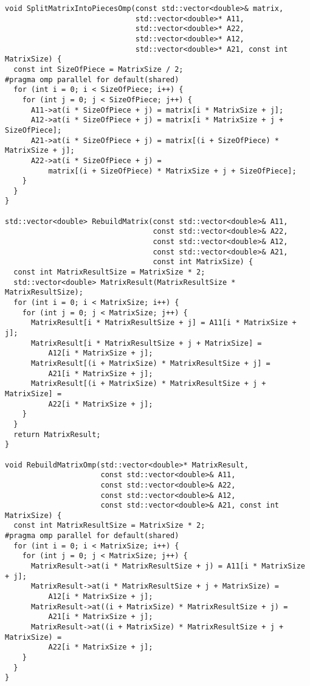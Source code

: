 \documentclass{report}
\begin{document}
\begin{lstlisting}
void SplitMatrixIntoPiecesOmp(const std::vector<double>& matrix,
                              std::vector<double>* A11,
                              std::vector<double>* A22,
                              std::vector<double>* A12,
                              std::vector<double>* A21, const int MatrixSize) {
  const int SizeOfPiece = MatrixSize / 2;
#pragma omp parallel for default(shared)
  for (int i = 0; i < SizeOfPiece; i++) {
    for (int j = 0; j < SizeOfPiece; j++) {
      A11->at(i * SizeOfPiece + j) = matrix[i * MatrixSize + j];
      A12->at(i * SizeOfPiece + j) = matrix[i * MatrixSize + j + SizeOfPiece];
      A21->at(i * SizeOfPiece + j) = matrix[(i + SizeOfPiece) * MatrixSize + j];
      A22->at(i * SizeOfPiece + j) =
          matrix[(i + SizeOfPiece) * MatrixSize + j + SizeOfPiece];
    }
  }
}

std::vector<double> RebuildMatrix(const std::vector<double>& A11,
                                  const std::vector<double>& A22,
                                  const std::vector<double>& A12,
                                  const std::vector<double>& A21,
                                  const int MatrixSize) {
  const int MatrixResultSize = MatrixSize * 2;
  std::vector<double> MatrixResult(MatrixResultSize * MatrixResultSize);
  for (int i = 0; i < MatrixSize; i++) {
    for (int j = 0; j < MatrixSize; j++) {
      MatrixResult[i * MatrixResultSize + j] = A11[i * MatrixSize + j];
      MatrixResult[i * MatrixResultSize + j + MatrixSize] =
          A12[i * MatrixSize + j];
      MatrixResult[(i + MatrixSize) * MatrixResultSize + j] =
          A21[i * MatrixSize + j];
      MatrixResult[(i + MatrixSize) * MatrixResultSize + j + MatrixSize] =
          A22[i * MatrixSize + j];
    }
  }
  return MatrixResult;
}

void RebuildMatrixOmp(std::vector<double>* MatrixResult,
                      const std::vector<double>& A11,
                      const std::vector<double>& A22,
                      const std::vector<double>& A12,
                      const std::vector<double>& A21, const int MatrixSize) {
  const int MatrixResultSize = MatrixSize * 2;
#pragma omp parallel for default(shared)
  for (int i = 0; i < MatrixSize; i++) {
    for (int j = 0; j < MatrixSize; j++) {
      MatrixResult->at(i * MatrixResultSize + j) = A11[i * MatrixSize + j];
      MatrixResult->at(i * MatrixResultSize + j + MatrixSize) =
          A12[i * MatrixSize + j];
      MatrixResult->at((i + MatrixSize) * MatrixResultSize + j) =
          A21[i * MatrixSize + j];
      MatrixResult->at((i + MatrixSize) * MatrixResultSize + j + MatrixSize) =
          A22[i * MatrixSize + j];
    }
  }
}


\end{lstlisting}
\end{document}
